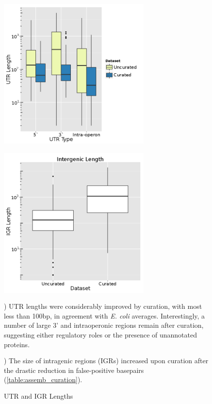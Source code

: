 \begin{figure}
\begin{center}
\begin{minipage}{.48\textwidth}
\begin{center}
{\includegraphics[width=\linewidth,height=3in]{images/Assembly/Curation/PairvsCuration_utrlength.png}
\label{fig:5.20a}}
\end{center}
\end{minipage}
\begin{minipage}{.48\textwidth}
\begin{center}
{\includegraphics[width=\linewidth,height=3in]{images/Assembly/Curation/PairvsCuration_igrlength.png}
\label{fig:5.20b}}
\end{center}
\end{minipage}%
\end{center}
\caption{UTR and IGR Lengths}
) UTR lengths were considerably improved by curation, with most less than 100bp, in agreement with \textit{E. coli} averages.\cite{87} Interestingly, a number of large 3' and intraoperonic regions remain after curation, suggesting either regulatory roles or the presence of unannotated proteins.

) The size of intragenic regions (IGRs) increased upon curation after the drastic reduction in false-positive basepairs (\ref{table:assemb_curation}).
\end{figure}

